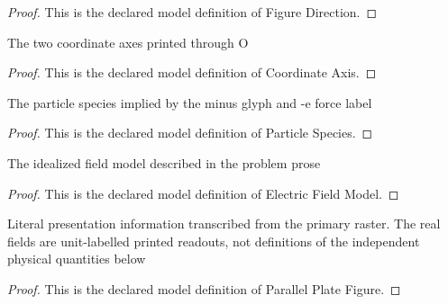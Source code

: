 \begin{proof}
  This is the declared model definition of Figure Direction.
\end{proof}
\begin{definition}
  \label{def:physics:phyx-mini-0993:phyxminiproblems-problemphyxmini0993-coordinateaxis}
  The two coordinate axes printed through O
\end{definition}
\begin{proof}
  This is the declared model definition of Coordinate Axis.
\end{proof}
\begin{definition}
  \label{def:physics:phyx-mini-0993:phyxminiproblems-problemphyxmini0993-particlespecies}
  The particle species implied by the minus glyph and -e force label
\end{definition}
\begin{proof}
  This is the declared model definition of Particle Species.
\end{proof}
\begin{definition}
  \label{def:physics:phyx-mini-0993:phyxminiproblems-problemphyxmini0993-electricfieldmodel}
  The idealized field model described in the problem prose
\end{definition}
\begin{proof}
  This is the declared model definition of Electric Field Model.
\end{proof}
\begin{definition}
  \label{def:physics:phyx-mini-0993:phyxminiproblems-problemphyxmini0993-parallelplatefigure}
  Literal presentation information transcribed from the primary raster. The real fields are unit-labelled printed readouts, not definitions of the independent physical quantities below
\end{definition}
\begin{proof}
  This is the declared model definition of Parallel Plate Figure.
\end{proof}
